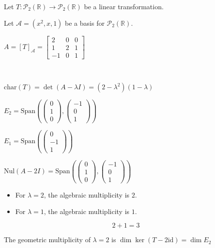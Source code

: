 \documentclass[11pt,fleqn]{book} %
\begin{document}
\begin{example}

Let $T: \mathcal{P}_2(\mathbb{R}) \to \mathcal{P}_2(\mathbb{R})$ be a linear transformation. 

Let $\mathcal{A} = (x^2, x, 1)$ be a basis for $\mathcal{P}_2(\mathbb{R})$. 

$A = [T]_\mathcal{A} = \begin{bmatrix} 2 &0 &0 \\ 1 &2 &1 \\ -1 &0 &1 \end{bmatrix}$

{~~~}

$\mathrm{char}(T) = \det(A - \lambda I) = (2 - \lambda^2)(1 - \lambda)$

$E_2 = \mathrm{Span}\left( \begin{pmatrix} 0 \\ 1 \\ 0 \end{pmatrix}, \begin{pmatrix} -1 \\ 0 \\ 1 \end{pmatrix} \right)$

$E_1 = \mathrm{Span}\left( \begin{pmatrix} 0 \\ -1 \\ 1 \end{pmatrix} \right)$

\end{example}


$\mathrm{Nul}(A - 2I) = \mathrm{Span}\left(\begin{pmatrix} 0 \\ 1 \\ 0 \end{pmatrix}, \begin{pmatrix} -1 \\ 0 \\ 1 \end{pmatrix}\right)$

\begin{itemize}
    \item For $\lambda = 2$, the algebraic multiplicity is $2$. 
    \item For $\lambda = 1$, the algebraic multiplicity is $1$. 
\end{itemize}
$$2+1 = 3$$

The geometric multiplicity of $\lambda = 2$ is $\dim \ker (T - 2 \mathrm{id}) = \dim E_2$
\end{document}
